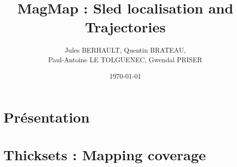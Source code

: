 \documentclass[french]{beamer}
\title{MagMap : Sled localisation and Trajectories}
\date{\vfill \centering\today}
\author{
    \centering    
    Jules BERHAULT, Quentin BRATEAU,\\Paul-Antoine LE TOLGUENEC, Gwendal PRISER
}
\institute{
    \centering
    \texttt{[image: images/logo/logo\_ensta.jpg]}
}
\begin{document}
    \maketitle

    \changefontsizes{10pt}

    \section{Présentation}
        

    \section{Thicksets : Mapping coverage}
        
        
        

    \maketitle
\end{document}
